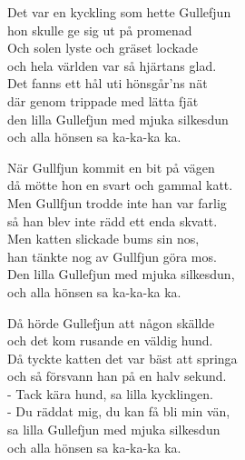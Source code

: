 \vspace{10pt}
Det var en kyckling som hette Gullefjun \\
hon skulle ge sig ut på promenad\\
Och solen lyste och gräset lockade\\
och hela världen var så hjärtans glad. \\
Det fanns ett hål uti hönsgår'ns nät\\
där genom trippade med lätta fjät \\
den lilla Gullefjun med mjuka silkesdun\\
och alla hönsen sa ka-ka-ka ka.\par
\vspace{10pt}
När Gullfjun kommit en bit på vägen\\
då mötte hon en svart och gammal katt.\\
Men Gullfjun trodde inte han var farlig\\
så han blev inte rädd ett enda skvatt.\\
Men katten slickade bums sin nos,\\
han tänkte nog av Gullfjun göra mos.\\
Den lilla Gullefjun med mjuka silkesdun,\\
och alla hönsen sa ka-ka-ka ka.\par
\vspace{10pt}
Då hörde Gullefjun att någon skällde\\
och det kom rusande en väldig hund.\\
Då tyckte katten det var bäst att springa\\
och så försvann han på en halv sekund.\\
- Tack kära hund, sa lilla kycklingen.\\
- Du räddat mig, du kan få bli min vän,\\
sa lilla Gullefjun med mjuka silkesdun\\
och alla hönsen sa ka-ka-ka ka.
